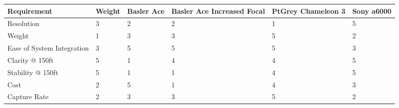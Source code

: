 \documentclass[]{auvsi_doc}
\begin{document}
\begin{AUVSITitlePage}
\begin{artifacttable}
\end{artifacttable}
\end{AUVSITitlePage}

\begin{table}[H]
	\centering
	\begin{tabular}{|p{3.0cm}|p{1.5cm}|p{2.0cm}|p{2.5cm}|p{2.5cm}|p{2.0cm}|}
	\hline
	\rowcolor[HTML]{C0C0C0}
{\color[HTML]{000000} \textbf{Requirement}} & {\color[HTML]{000000} \textbf{Weight}} & {\color[HTML]{000000} \textbf{Basler Ace}} & {\color[HTML]{000000} \textbf{Basler Ace Increased Focal}} & {\color[HTML]{000000} \textbf{PtGrey Chameleon 3}} & {\color[HTML]{000000} \textbf{Sony a6000}}\\ \hline
Resolution	& 3	& 2	& 2	& 1	& 5 \\ \hline
Weight	&	1	&	3 &	3 	& 	5 	&	2 \\ \hline 
Ease of System Integration	&	3 	&	5 	& 	5 	& 	5 	& 	3 \\ \hline
Clarity @ 150ft	&	5 	&	1 	& 	4	&	4	&	5 \\ \hline
Stability @ 150ft	&	5 	&	1 	&	1 	&	4	&	5 \\ \hline
Cost	&	2 	&	5 	&	1 	&	4	&	3 \\ \hline
Capture Rate	&	2 	&	3 	&	3 	&	5 	&	2 \\ \hline
	\end{tabular}
\end{table}
\end{document}

